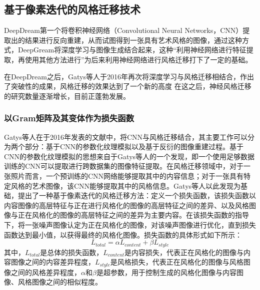 \subsection{基于像素迭代的风格迁移技术}

DeepDream\cite{mordvintsevInceptionismGoingDeeper2015}第一个将卷积神经网络（Convolutional Neural Networks，CNN）提取出的结果进行反向重建，从而试图得到一张具有艺术风格的图像\cite{jingNeuralStyleTransfer2020}，通过这种方式，DeepGream将深度学习与图像生成结合起来，这种“利用神经网络进行特征提取，再使用其他方法进行”为后来利用神经网络进行风格迁移打下了一定的基础。

在DeepDream之后，Gatys等人\cite{gatysImageStyleTransfer2016}于2016年再次将深度学习与风格迁移相结合，作出了突破性的成果，风格迁移的效果达到了一个新的高度%
在这之后，神经风格迁移的研究数量逐渐增长，目前正蓬勃发展。


\subsubsection{以Gram矩阵及其变体作为损失函数}

Gatys等人在于2016年发表的文献\cite{gatysImageStyleTransfer2016}中，将CNN与风格迁移结合，其主要工作可以分为两个部分：基于CNN的参数化纹理模拟以及基于反衍的图像重建过程\cite{gatysImageStyleTransfer2016}。基于CNN的参数化纹理模拟的思想来自于Gatys等人的一个发现，即一个使用足够数据训练的CNN可以提取进行跨数据集的图像特征提取\cite{gatysImageStyleTransfer2016}。在风格迁移领域中，对于一张照片而言，一个预训练的CNN网络能够提取其中的内容信息；对于一张具有特定风格的艺术图像，该CNN能够提取其中的风格信息。Gatys等人以此发现为基础，提出了一种基于像素迭代的风格迁移方法：定义一个损失函数，该损失函数以内容图像的高层特征与正在进行风格化的图像的高层特征之间的差异、以及风格图像与正在风格化的图像的高层特征之间的差异为主要内容。在该损失函数的指导下，将一张噪声图像认定为正在风格化的图像，对该噪声图像进行优化，直到损失函数达到最小值，以获得最终的风格化图像。损失函数的具体形式如下所示：
\begin{equation}
    \label{Gatys_total_loss}
    L_{total}=\alpha L_{content}+ \beta L_{style}
\end{equation}
其中，$L_{total}$是总体的损失函数，$L_{content}$是内容损失，代表正在风格化的图像与内容图像之间的内容差异程度，$L_{style}$是风格损失，代表正在风格化的图像与风格图像之间的风格差异程度，$\alpha$和$\beta$是超参数，用于控制生成的风格化图像与内容图像、风格图像之间的相似程度。

